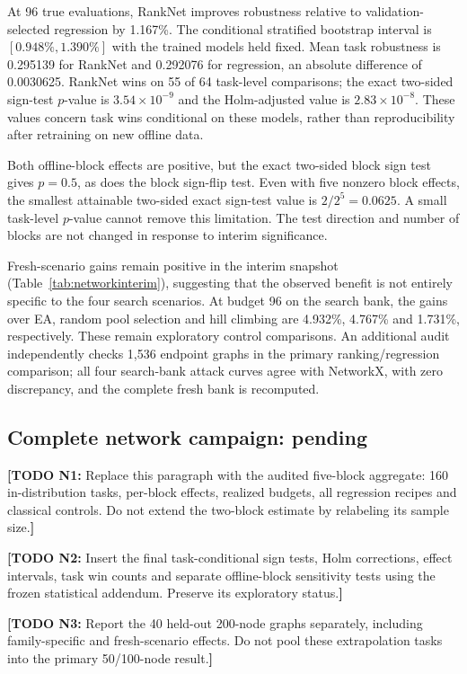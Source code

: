 \documentclass[11pt,a4paper]{article}
\newcommand{\todo}[2]{\textcolor{red!65!black}{\textbf{[TODO #1:} #2\textbf{]}}}
\begin{document}
At 96 true evaluations, RankNet improves robustness relative to validation-selected regression by 1.167\%. The conditional stratified bootstrap interval is $[0.948\%,1.390\%]$ with the trained models held fixed. Mean task robustness is 0.295139 for RankNet and 0.292076 for regression, an absolute difference of 0.0030625. RankNet wins on 55 of 64 task-level comparisons; the exact two-sided sign-test $p$-value is $3.54\times10^{-9}$ and the Holm-adjusted value is $2.83\times10^{-8}$. These values concern task wins conditional on these models, rather than reproducibility after retraining on new offline data.


Both offline-block effects are positive, but the exact two-sided block sign test gives $p=0.5$, as does the block sign-flip test. Even with five nonzero block effects, the smallest attainable two-sided exact sign-test value is $2/2^5=0.0625$. A small task-level $p$-value cannot remove this limitation. The test direction and number of blocks are not changed in response to interim significance.

Fresh-scenario gains remain positive in the interim snapshot (Table~\ref{tab:networkinterim}), suggesting that the observed benefit is not entirely specific to the four search scenarios. At budget 96 on the search bank, the gains over EA, random pool selection and hill climbing are 4.932\%, 4.767\% and 1.731\%, respectively. These remain exploratory control comparisons. An additional audit independently checks 1,536 endpoint graphs in the primary ranking/regression comparison; all four search-bank attack curves agree with NetworkX, with zero discrepancy, and the complete fresh bank is recomputed.

\subsection{Complete network campaign: pending}
\todo{N1}{Replace this paragraph with the audited five-block aggregate: 160 in-distribution tasks, per-block effects, realized budgets, all regression recipes and classical controls. Do not extend the two-block estimate by relabeling its sample size.}

\todo{N2}{Insert the final task-conditional sign tests, Holm corrections, effect intervals, task win counts and separate offline-block sensitivity tests using the frozen statistical addendum. Preserve its exploratory status.}

\todo{N3}{Report the 40 held-out 200-node graphs separately, including family-specific and fresh-scenario effects. Do not pool these extrapolation tasks into the primary 50/100-node result.}
\end{document}
